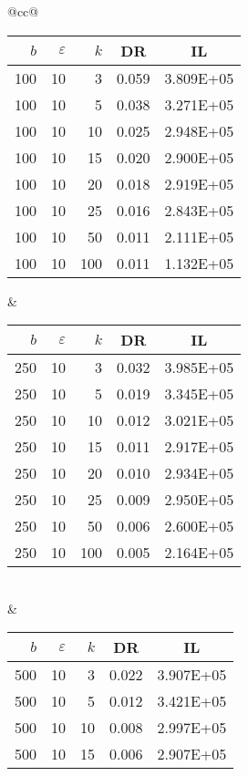 \begin{table}[H]
	\centering
	\begin{tabular}{@{}cc@{}}
		\begin{tabular}{@{}rrrrr@{}}
			\toprule
			$b$ & $\varepsilon$ & $k$ & \multicolumn{1}{c}{DR} & \multicolumn{1}{c}{IL} \\ \midrule
			100 & 10 & 3   & 0.059 & 3.809E+05 \\
			100 & 10 & 5   & 0.038 & 3.271E+05 \\
			100 & 10 & 10  & 0.025 & 2.948E+05 \\
			100 & 10 & 15  & 0.020 & 2.900E+05 \\
			100 & 10 & 20  & 0.018 & 2.919E+05 \\
			100 & 10 & 25  & 0.016 & 2.843E+05 \\
			100 & 10 & 50  & 0.011 & 2.111E+05 \\
			100 & 10 & 100 & 0.011 & 1.132E+05 \\ \bottomrule
		\end{tabular}
		&
		\begin{tabular}{@{}rrrrr@{}}
			\toprule
			$b$ & $\varepsilon$ & $k$ & \multicolumn{1}{c}{DR} & \multicolumn{1}{c}{IL} \\ \midrule
			250 & 10 & 3   & 0.032 & 3.985E+05 \\
			250 & 10 & 5   & 0.019 & 3.345E+05 \\
			250 & 10 & 10  & 0.012 & 3.021E+05 \\
			250 & 10 & 15  & 0.011 & 2.917E+05 \\
			250 & 10 & 20  & 0.010 & 2.934E+05 \\
			250 & 10 & 25  & 0.009 & 2.950E+05 \\
			250 & 10 & 50  & 0.006 & 2.600E+05 \\
			250 & 10 & 100 & 0.005 & 2.164E+05 \\ \bottomrule
		\end{tabular}
		\\ & \\
		\begin{tabular}{@{}rrrrr@{}}
			\toprule
			$b$ & $\varepsilon$ & $k$ & \multicolumn{1}{c}{DR} & \multicolumn{1}{c}{IL} \\ \midrule
			500 & 10 & 3   & 0.022 & 3.907E+05 \\
			500 & 10 & 5   & 0.012 & 3.421E+05 \\
			500 & 10 & 10  & 0.008 & 2.997E+05 \\
			500 & 10 & 15  & 0.006 & 2.907E+05 \\

\end{tabular}
\end{tabular}
\end{table}

